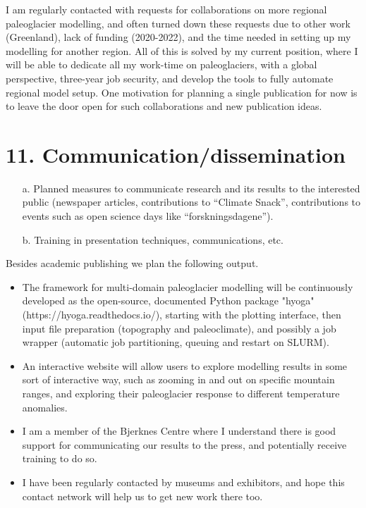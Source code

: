 \documentclass{article}
\newcommand{\guideline}[1]{{\color{color2}\itshape{#1}}}
\begin{document}
    I am regularly contacted with requests for collaborations on more regional
    paleoglacier modelling, and often turned down these requests due to other
    work (Greenland), lack of funding (2020-2022), and the time needed in
    setting up my modelling for another region. All of this is solved by my
    current position, where I will be able to dedicate all my work-time on
    paleoglaciers, with a global perspective, three-year job security, and
    develop the tools to fully automate regional model setup. One motivation
    for planning a single publication for now is to leave the door open for
    such collaborations and new publication ideas.


\section{11. Communication/dissemination}

    \guideline{
        \begin{itemize}
          \item[a.] Planned measures to communicate research and its results to
            the interested public (newspaper articles, contributions to
            ``Climate Snack'', contributions to events such as open science
            days like ``forskningsdagene'').
          \item[b.] Training in presentation techniques, communications, etc.
        \end{itemize}}

    Besides academic publishing we plan the following output.

    \begin{itemize}
      \item The framework for multi-domain paleoglacier modelling will be
        continuously developed as the open-source, documented Python package
        "hyoga" (https://hyoga.readthedocs.io/), starting with the plotting
        interface, then input file preparation (topography and paleoclimate),
        and possibly a job wrapper (automatic job partitioning, queuing and
        restart on SLURM).
      \item An interactive website will allow users to explore modelling
        results in some sort of interactive way, such as zooming in and out on
        specific mountain ranges, and exploring their paleoglacier response to
        different temperature anomalies.
      \item I am a member of the Bjerknes Centre where I understand there is
        good support for communicating our results to the press, and
        potentially receive training to do so.
      \item I have been regularly contacted by museums and exhibitors, and hope
        this contact network will help us to get new work there too.
    \end{itemize}
\end{document}
